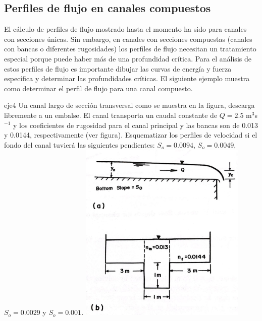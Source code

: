 \documentclass[11pt, oneside]{article}
\begin{document}
\subsection{Perfiles de flujo en canales compuestos}
El c\'alculo de perfiles de flujo mostrado hasta el momento ha sido para canales con secciones \'unicas. Sin embargo, en canales con secciones compuestas (canales con bancas o diferentes rugosidades) los perfiles de flujo necesitan un tratamiento especial porque puede haber m\'as de una profundidad cr\'itica. Para el an\'alisis de estos perfiles de flujo es importante dibujar las curvas de energ\'ia y fuerza espec\'ifica y determinar las profundidades cr\'iticas. El siguiente ejemplo muestra como determinar el perfil de flujo para una canal compuesto. 

\begin{eje}{}{eje4}
Un canal largo de secci\'on transversal como se muestra en la figura, descarga libremente a un embalse. El canal transporta un caudal constante de $Q = 2.5$ m$^3$s$^{-1}$ y los coeficientes de rugosidad para el canal principal y las bancas son de 0.013 y 0.0144, respectivamente (ver figura). Esquematizar los perfiles de velocidad si el fondo del canal tuvier\'a las siguientes pendientes: $S_o = 0.0094$, $S_o = 0.0049$, $S_o = 0.0029$ y $S_o = 0.001$.  
\includegraphics[width=8cm]{fig54e.jpeg}
\end{eje}
\end{document}
